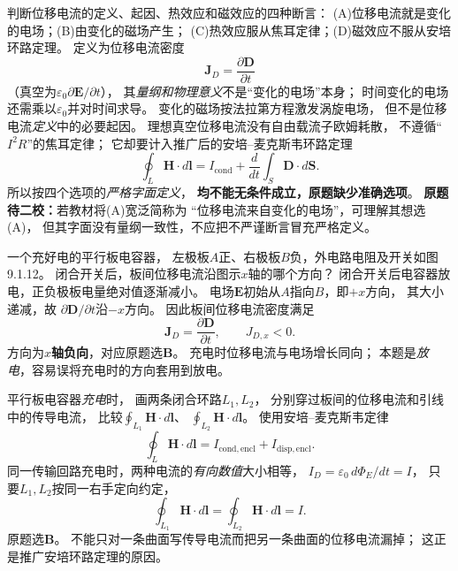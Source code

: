 \problemtext 判断位移电流的定义、起因、热效应和磁效应的四种断言：
(A)位移电流就是变化的电场；(B)由变化的磁场产生；
(C)热效应服从焦耳定律；(D)磁效应不服从安培环路定理。
\workings
定义为位移电流密度
\[
\boxed{\bm J_D=\frac{\partial\bm D}{\partial t}}
\]
（真空为$\varepsilon_0\partial\bm E/\partial t$），
其\emph{量纲和物理意义}不是“变化的电场”本身；
时间变化的电场还需乘以$\varepsilon_0$并对时间求导。
变化的磁场按法拉第方程激发涡旋电场，
但不是位移电流\emph{定义}中的必要起因。
理想真空位移电流没有自由载流子欧姆耗散，
不遵循“$I^2R$”的焦耳定律；
它却要计入推广后的安培--麦克斯韦环路定理
\[
\oint_L\bm H\cdot d\bm l
=I_{\mathrm{cond}}+\frac{d}{dt}\int_S\bm D\cdot d\bm S.
\]
所以按四个选项的\emph{严格字面定义}，
\textbf{均不能无条件成立，原题缺少准确选项}。
\crosscheck \textbf{原题待二校：}若教材将(A)宽泛简称为
“位移电流来自变化的电场”，可理解其想选(A)，
但其字面没有量纲一致性，不应把不严谨断言冒充严格定义。

\problemtext 一个充好电的平行板电容器，
左极板$A$正、右极板$B$负，外电路电阻及开关如图9.1.12。
闭合开关后，板间位移电流沿图示$x$轴的哪个方向？
\workings
闭合开关后电容器放电，正负极板电量绝对值逐渐减小。
电场$\bm E$初始从$A$指向$B$，即$+x$方向，
其大小递减，故
$\partial\bm D/\partial t$沿$-x$方向。
因此板间位移电流密度满足
\[
\boxed{\bm J_D=\frac{\partial\bm D}{\partial t},\qquad J_{D,x}<0}.
\]
方向为\textbf{$x$轴负向}，对应原题选\textbf{B}。
\crosscheck 充电时位移电流与电场增长同向；
本题是\emph{放电}，容易误将充电时的方向套用到放电。

\problemtext 平行板电容器\emph{充电}时，
画两条闭合环路$L_1,L_2$，
分别穿过板间的位移电流和引线中的传导电流，
比较$\oint_{L_1}\bm H\cdot d\bm l$、
$\oint_{L_2}\bm H\cdot d\bm l$。
\workings
使用安培--麦克斯韦定律
\[
\oint_L\bm H\cdot d\bm l
=I_{\mathrm{cond,encl}}+I_{\mathrm{disp,encl}}.
\]
同一传输回路充电时，两种电流的\emph{有向数值}大小相等，
$I_D=\varepsilon_0\,d\Phi_E/dt=I$，
只要$L_1,L_2$按同一右手定向约定，
\[
\boxed{\oint_{L_1}\bm H\cdot d\bm l
=\oint_{L_2}\bm H\cdot d\bm l=I}.
\]
原题选\textbf{B}。
\crosscheck 不能只对一条曲面写传导电流而把另一条曲面的位移电流漏掉；
这正是推广安培环路定理的原因。
